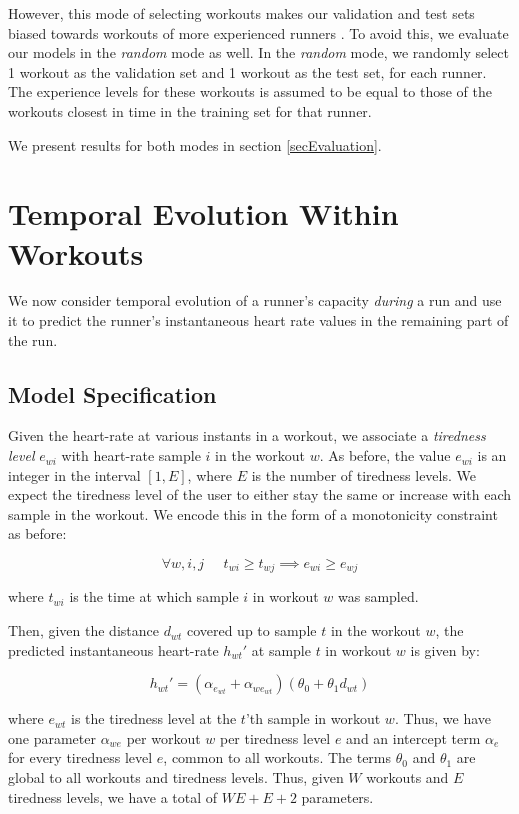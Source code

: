\documentclass{acm_proc_article-sp}
\begin{document}
However, this mode of selecting workouts makes our validation and test sets biased towards workouts of more experienced runners \cite{www13}. To avoid this, we evaluate our models in the \emph{random} mode as well. In the \emph{random} mode, we randomly select 1 workout as the validation set and 1 workout as the test set, for each runner. The experience levels for these workouts is assumed to be equal to those of the workouts closest in time in the training set for that runner. 

We present results for both modes in section \ref{secEvaluation}.

\section{Temporal Evolution Within \\ Workouts}
\label{secTemporalModelWorkouts}
We now consider temporal evolution of a runner's capacity \emph{during} a run and use it to predict the runner's instantaneous heart rate values in the remaining part of the run. 

\subsection{Model Specification}

Given the heart-rate at various instants in a workout, we associate a \emph{tiredness level} $e_{wi}$ with heart-rate sample $i$ in the workout $w$. As before, the value $e_{wi}$ is an integer in the interval $[1, E]$, where $E$ is the number of tiredness levels. We expect the tiredness level of the user to either stay the same or increase with each sample in the workout. We encode this in the form of a monotonicity constraint as before:

$$\forall w,i,j \;\;\;\;\; t_{wi} \geq t_{wj} \implies e_{wi} \geq e_{wj}$$

where $t_{wi}$ is the time at which sample $i$ in workout $w$ was sampled.

Then, given the distance $d_{wt}$ covered up to sample $t$ in the workout $w$, the predicted instantaneous heart-rate $h_{wt}'$ at sample $t$ in workout $w$ is given by:

\begin{equation}
\label{eqnModelInstHr}
h_{wt}' = (\alpha_{e_{wt}} + \alpha_{we_{wt}})(\theta_0 + \theta_1 d_{wt})
\end{equation}

where $e_{wt}$ is the tiredness level at the $t$'th sample in workout $w$. Thus, we have one parameter $\alpha_{we}$ per workout $w$ per tiredness level $e$ and an intercept term $\alpha_e$ for every tiredness level $e$, common to all workouts. The terms $\theta_0$ and $\theta_1$ are global to all workouts and tiredness levels. Thus, given $W$ workouts and $E$ tiredness levels, we have a total of $WE + E + 2$ parameters.
\end{document}
